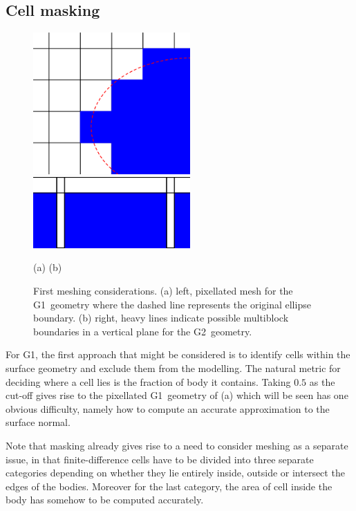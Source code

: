 \subsection{Cell masking}\label{sec:mask}
\begin{figure}[h]
\centerline{\includegraphics[width=6cm]{../pics/mellpix}
\hspace{1cm}\includegraphics[width=6cm]{../pics/vgapp}
}
\centerline{(a) \hspace{7cm}(b)}
\caption{First meshing considerations.
(a) left, pixellated mesh for the G1~geometry where the dashed line represents the original ellipse boundary.
(b) right, heavy lines indicate possible multiblock boundaries in a vertical plane
for the G2~geometry.
\label{fig:mellpix}}
\end{figure}
For G1, the first approach that might be considered is to identify cells within the surface
geometry and exclude them from the modelling. The natural metric for deciding where
a cell lies is the fraction of body it contains. Taking $0.5$ as the cut-off
gives rise to the pixellated G1~geometry of (a) which will be seen
has one obvious difficulty, namely
how to compute an accurate approximation to the surface normal.

Note that masking already gives rise to a need to consider meshing as a separate issue,
in that finite-difference cells have to be divided into three separate categories depending on whether
they lie entirely inside, outside or intersect the edges of the bodies.  Moreover for the
last category, the area of cell inside the body has somehow to be computed accurately.

